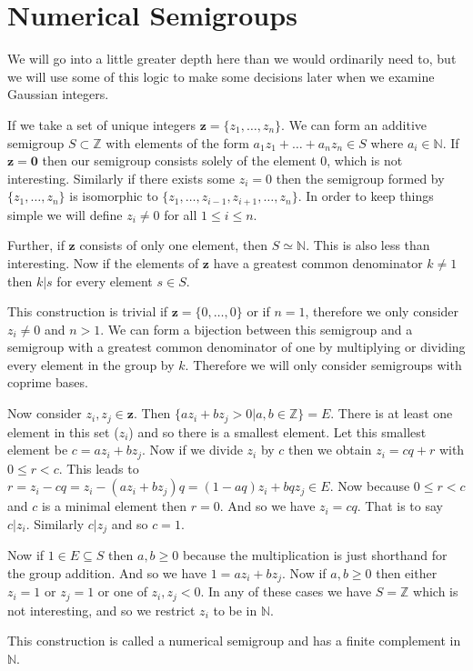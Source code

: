 \documentclass[11pt]{amsart}
\theoremstyle{plain}
\theoremstyle{definition}
\begin{document}
\section{Numerical Semigroups}
We will go into a little greater depth here than we would ordinarily need to, but we will use some of this logic to make some decisions later when we examine Gaussian integers.

If we take a set of unique integers $\mathbf{z}=\{z_1,\dots,z_n\}$.
We can form an additive semigroup $S\subset \mathbb{Z}$ with elements of the form $a_1z_1+\dots+a_nz_n\in S$ where $a_i\in \mathbb{N}$.
If $\mathbf{z}=\mathbf{0}$ then our semigroup consists solely of the element $0$, which is not interesting. Similarly if there exists some $z_i=0$ then the semigroup formed by $\{z_1,\dots,z_n\}$ is isomorphic to $\{z_1,\dots,z_{i-1},z_{i+1},\dots,z_n\}$. In order to keep things simple we will define $z_i\ne 0$ for all $1\le i\le n$.

Further, if $\mathbf{z}$ consists of only one element, then $S\simeq\mathbb{N}$. This is also less than interesting.
Now if the elements of $\mathbf{z}$ have a greatest common denominator $k\ne 1$ then $k|s$ for every element $s\in S$.

This construction is trivial if $\mathbf{z}=\{0,\dots,0\}$ or if $n=1$, therefore we only consider $z_i\ne 0$ and $n>1$.
We can form a bijection between this semigroup and a semigroup with a greatest common denominator of one by multiplying or dividing every element in the group by $k$.
Therefore we will only consider semigroups with coprime bases.

Now consider $z_i,z_j\in \mathbf{z}$.
Then $\{az_i+bz_j>0|a,b\in \mathbb{Z}\}=E$.
There is at least one element in this set ($z_i$) and so there is a smallest element. Let this smallest element be $c=az_i+bz_j$.
Now if we divide $z_i$ by $c$ then we obtain $z_i=cq+r$ with $0\le r<c$.
This leads to $r=z_i-cq=z_i-(az_i+bz_j)q=(1-aq)z_i+bqz_j\in E$. Now because $0\le r<c$ and $c$ is a minimal element then $r=0$. And so we have $z_i=cq$.
That is to say $c|z_i$. Similarly $c|z_j$ and so $c=1$.

Now if $1\in E\subseteq S$ then $a,b\ge0$ because the multiplication is just shorthand for the group addition. And so we have $1=az_i+bz_j$.
Now if $a,b\ge 0$ then either $z_i=1$ or $z_j=1$ or one of $z_i,z_j<0$. In any of these cases we have $S=\mathbb{Z}$ which is not interesting, and so we restrict $z_i$ to be in $\mathbb{N}$.

This construction is called a numerical semigroup and has a finite complement in $\mathbb{N}$.\cite{aoki}
\end{document}
